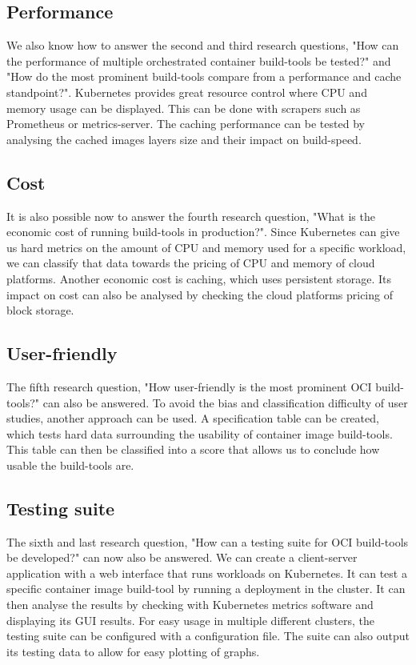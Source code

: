\subsection{Performance}
We also know how to answer the second and third research questions, "How can the performance of multiple orchestrated container build-tools be tested?" and "How do the most prominent build-tools compare from a performance and cache standpoint?". Kubernetes provides great resource control where CPU and memory usage can be displayed. This can be done with scrapers such as Prometheus or metrics-server. The caching performance can be tested by analysing the cached images layers size and their impact on build-speed. 
\subsection{Cost}
It is also possible now to answer the fourth research question, "What is the economic cost of running build-tools in production?". Since Kubernetes can give us hard metrics on the amount of CPU and memory used for a specific workload, we can classify that data towards the pricing of CPU and memory of cloud platforms. Another economic cost is caching, which uses persistent storage. Its impact on cost can also be analysed by checking the cloud platforms pricing of block storage. 
\subsection{User-friendly}
The fifth research question, "How user-friendly is the most prominent OCI build-tools?" can also be answered. To avoid the bias and classification difficulty of user studies, another approach can be used. A specification table can be created, which tests hard data surrounding the usability of container image build-tools. This table can then be classified into a score that allows us to conclude how usable the build-tools are. 
\subsection{Testing suite}
The sixth and last research question, "How can a testing suite for OCI build-tools be developed?" can now also be answered. We can create a client-server application with a web interface that runs workloads on Kubernetes. It can test a specific container image build-tool by running a deployment in the cluster. It can then analyse the results by checking with Kubernetes metrics software and displaying its GUI results. For easy usage in multiple different clusters, the testing suite can be configured with a configuration file. The suite can also output its testing data to allow for easy plotting of graphs. 
